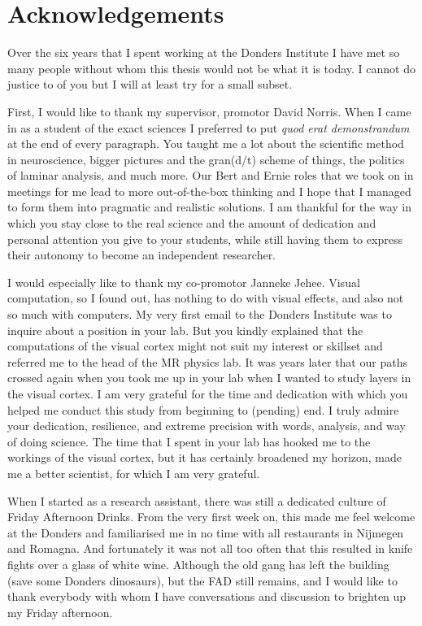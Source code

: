 \section{Acknowledgements}

Over the six years that I spent working at the Donders Institute I have met so many people without whom this thesis would not be what it is today. I cannot do justice to of you but I will at least try for a small subset.

First, I would like to thank my supervisor, promotor David Norris. When I came in as a student of the exact sciences I preferred to put \emph{quod erat demonstrandum} at the end of every paragraph. You taught me a lot about the scientific method in neuroscience, bigger pictures and the gran(d/t) scheme of things, the politics of laminar analysis, and much more. Our Bert and Ernie roles that we took on in meetings for me lead to more out-of-the-box thinking and I hope that I managed to form them into pragmatic and realistic solutions. I am thankful for the way in which you stay close to the real science and the amount of dedication and personal attention you give to your students, while still having them to express their autonomy to become an independent researcher.

I would especially like to thank my co-promotor Janneke Jehee. Visual computation, so I found out, has nothing to do with visual effects, and also not so much with computers. My very first email to the Donders Institute was to inquire about a position in your lab. But you kindly explained that the computations of the visual cortex might not suit my interest or skillset and referred me to the head of the MR physics lab. It was years later that our paths crossed again when you took me up in your lab when I wanted to study layers in the visual cortex. I am very grateful for the time and dedication with which you helped me conduct this study from beginning to (pending) end. I truly admire your dedication, resilience, and extreme precision with words, analysis, and way of doing science. The time that I spent in your lab has hooked me to the workings of the visual cortex, but it has certainly broadened my horizon, made me a better scientist, for which I am very grateful.

When I started as a research assistant, there was still a dedicated culture of Friday Afternoon Drinks. From the very first week on, this made me feel welcome at the Donders and familiarised me in no time with all restaurants in Nijmegen and Romagna. And fortunately it was not all too often that this resulted in knife fights over a glass of white wine. Although the old gang has left the building (save some Donders dinosaurs), but the FAD still remains, and I would like to thank everybody with whom I have conversations and discussion to brighten up my Friday afternoon.

